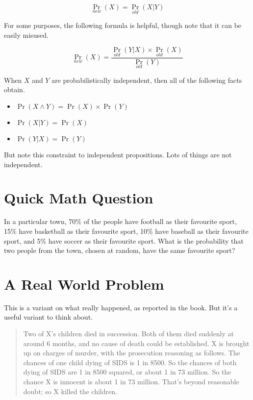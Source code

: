 \[
\Pr_{new}(X) = \Pr_{old}(X | Y)
\]

For some purposes, the following formula is helpful, though note that it can be easily misused.

\[
\Pr_{new}(X) = \frac{\Pr_{old}(Y | X) \times \Pr_{old}(X)}{\Pr_{old}(Y)}
\]

When $X$ and $Y$ are probabilistically independent, then all of the following facts obtain.

\begin{itemize}
\item{} $\Pr(X \wedge Y) = \Pr(X) \times \Pr(Y)$

\item{} $\Pr(X | Y) = \Pr(X)$

\item{} $\Pr(Y | X) = \Pr(Y)$

\end{itemize}

But note this constraint to independent propositions. Lots of things are not independent.

\section{Quick Math Question}
\label{quickmathquestion}

In a particular town, 70\% of the people have football as their favourite sport, 15\% have basketball as their favourite sport, 10\% have baseball as their favourite sport, and 5\% have soccer as their favourite sport. What is the probability that two people from the town, chosen at random, have the same favourite sport?

\section{A Real World Problem}
\label{arealworldproblem}

This is a variant on what really happened, as reported in the book. But it's a useful variant to think about.

\begin{quote}
Two of X's children died in succession. Both of them died suddenly at around 6 months, and no cause of death could be established. X is brought up on charges of murder, with the prosecution reasoning as follows. The chances of one child dying of SIDS is 1 in 8500. So the chances of both dying of SIDS are 1 in 8500 squared, or about 1 in 73 million. So the chance X is innocent is about 1 in 73 million. That's beyond reasonable doubt; so X killed the children.
\end{quote}

